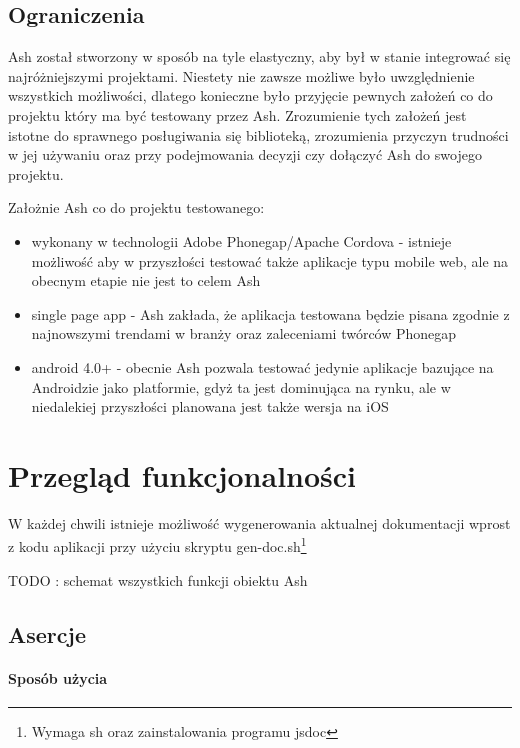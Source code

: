 \documentclass[brudnopis]{xmgr}
\begin{document}
\section{Ograniczenia}

Ash został stworzony w sposób na tyle elastyczny, aby był w stanie integrować się najróżniejszymi projektami. Niestety nie zawsze możliwe było uwzględnienie wszystkich możliwości, dlatego konieczne było przyjęcie pewnych założeń co do projektu który ma być testowany przez Ash. Zrozumienie tych założeń jest istotne do sprawnego posługiwania się biblioteką, zrozumienia przyczyn trudności w jej używaniu oraz przy podejmowania decyzji czy dołączyć Ash do swojego projektu.

Założnie Ash co do projektu testowanego:

\begin{itemize}
  \item wykonany w technologii Adobe Phonegap/Apache Cordova - istnieje możliwość aby w przyszłości testować także aplikacje typu mobile web, ale na obecnym etapie nie jest to celem Ash
  \item single page app - Ash zakłada, że aplikacja testowana będzie pisana zgodnie z najnowszymi trendami w branży oraz zaleceniami twórców Phonegap
  \item android 4.0+ - obecnie Ash pozwala testować jedynie aplikacje bazujące na Androidzie jako platformie, gdyż ta jest dominująca na rynku, ale w niedalekiej przyszłości planowana jest także wersja na iOS
\end{itemize}

\chapter{Przegląd funkcjonalności}

W każdej chwili istnieje możliwość wygenerowania aktualnej dokumentacji wprost z kodu aplikacji przy użyciu skryptu gen-doc.sh\footnote{Wymaga sh oraz zainstalowania programu jsdoc}

TODO : schemat wszystkich funkcji obiektu Ash

\section{Asercje}

\subsubsection{Sposób użycia}
\end{document}
